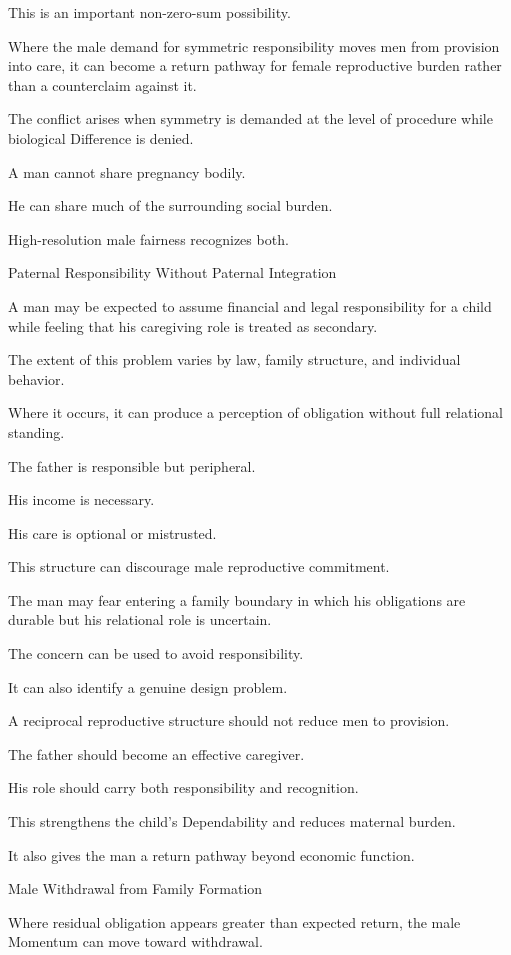 This is an important non-zero-sum possibility.

Where the male demand for symmetric responsibility moves men from provision into care, it can become a return pathway for female reproductive burden rather than a counterclaim against it.

The conflict arises when symmetry is demanded at the level of procedure while biological Difference is denied.

A man cannot share pregnancy bodily.

He can share much of the surrounding social burden.

High-resolution male fairness recognizes both.

Paternal Responsibility Without Paternal Integration

A man may be expected to assume financial and legal responsibility for a child while feeling that his caregiving role is treated as secondary.

The extent of this problem varies by law, family structure, and individual behavior.

Where it occurs, it can produce a perception of obligation without full relational standing.

The father is responsible but peripheral.

His income is necessary.

His care is optional or mistrusted.

This structure can discourage male reproductive commitment.

The man may fear entering a family boundary in which his obligations are durable but his relational role is uncertain.

The concern can be used to avoid responsibility.

It can also identify a genuine design problem.

A reciprocal reproductive structure should not reduce men to provision.

The father should become an effective caregiver.

His role should carry both responsibility and recognition.

This strengthens the child’s Dependability and reduces maternal burden.

It also gives the man a return pathway beyond economic function.

Male Withdrawal from Family Formation

Where residual obligation appears greater than expected return, the male Momentum can move toward withdrawal.


